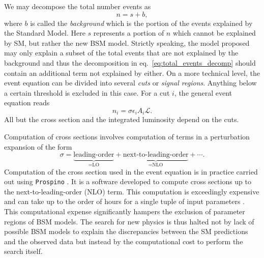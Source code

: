 We may decompose the total number events as
\begin{equation}\label{eq:total_events_decomp}
    n = s + b,
\end{equation}
where $b$ is called the \textit{background} which is the portion of the events explained by the Standard Model. Here $s$ represents a portion of $n$ which cannot be explained by SM, but rather the new BSM model. Strictly speaking, the model proposed may only explain a subset of the total events that are not explained by the background and thus the decomposition in eq.~\eqref{eq:total_events_decomp} should contain an additional term not explained by either. 
On a more technical level, the event equation can be divided into several \textit{cuts} or \textit{signal regions}. Anything below a certain threshold is excluded in this case. For a cut $i$, the general event equation reads
\begin{equation}\label{eq:general_event_eq}
    n_i = \sigma \epsilon_i A_i \mathcal{L}.
\end{equation} 
All but the cross section and the integrated luminosity depend on the cuts.

Computation of cross sections involves computation of terms in a perturbation expansion of the form 
\begin{equation}
    \sigma = \underbrace{\text{leading-order}}_{=\text{LO}} + \underbrace{\text{next-to-leading-order}}_{=\text{NLO}} + \cdots.
\end{equation}
Computation of the cross section used in the event equation is in practice carried out using {\tt Prospino} \cite{prospino}. It is a software developed to compute cross sections up to the next-to-leading-order (NLO) term. This computation is exceedingly expensive and can take up to the order of hours for a single tuple of input parameters \cite{xsec}. This computational expense significantly hampers the exclusion of parameter regions of BSM models. The search for new physics is thus halted not by lack of possible BSM models to explain the discrepancies between the SM predictions and the observed data but instead by the computational cost to perform the search itself.

